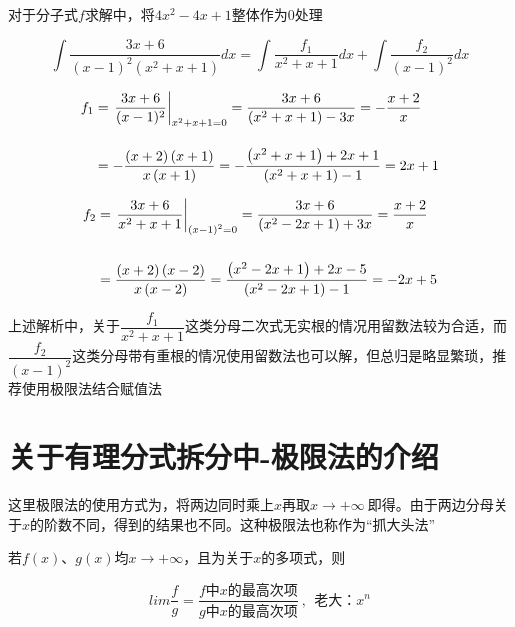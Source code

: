 对于分子式$f$求解中，将$4x^{2}-4x+1$整体作为0处理



\begin{equation}\label{liushufa-5}
	\int\dfrac{3x+6}{\left(x-1\right)^{2}\left(x^{2}+x+1\right)}dx=\int\dfrac{f_{1}}{x^{2}+x+1}dx+\int\dfrac{f_{2}}{\left(x-1\right)^{2}}dx
\end{equation} 

\vspace{-40pt}

\begin{align*}
	f_{1}&=\left. \dfrac{3x+6}{(x-1)^2} \right|_{\vphantom{\dfrac{1}{1}} x^{2}+x+1=0} = \dfrac{3x+6}{(x^{2}+x+1)-3x} = -\dfrac{x+2}{x} \\[5pt]
	&=-\dfrac{\left(x+2\right)\left(x+1\right)}{x\left(x+1\right)}=-\dfrac{\left(x^{2}+x+1\right)+2x+1}{\left(x^{2}+x+1\right)-1}=2x+1
\end{align*}

\vspace{-40pt}

\begin{align*}
	f_{2}&=\left. \dfrac{3x+6}{x^{2}+x+1} \right|_{\vphantom{\dfrac{1}{1}} \left(x-1\right)^{2}=0} = \dfrac{3x+6}{\left(x^{2}-2x+1\right)+3x} = \dfrac{x+2}{x} \\[10pt]
	&=\dfrac{\left(x+2\right)\left(x-2\right)}{x\left(x-2\right)}=\dfrac{\left(x^{2}-2x+1\right)+2x-5}{\left(x^{2}-2x+1\right)-1}=-2x+5
\end{align*}

上述解析中，关于$\dfrac{f_{1}}{x^{2}+x+1}$这类分母二次式无实根的情况用留数法较为合适，而$\dfrac{f_{2}}{\left(x-1\right)^{2}}$这类分母带有重根的情况使用留数法也可以解，但总归是略显繁琐，推荐使用极限法结合赋值法

\section{关于有理分式拆分中-极限法的介绍}
这里极限法的使用方式为，将两边同时乘上$x$再取$x\rightarrow+\infty\:$即得。由于两边分母关于$x$的阶数不同，得到的结果也不同。这种极限法也称作为“抓大头法”

\hspace{0.5em} 若$f(x)$、$g(x)$均$x\rightarrow+\infty$，且为关于$x$的多项式，则

\vspace{-10pt}

\[lim\dfrac{f}{g}=\dfrac{f中x的最高次项}{g中x的最高次项}\:,\:\:老大：x^{n}\]

